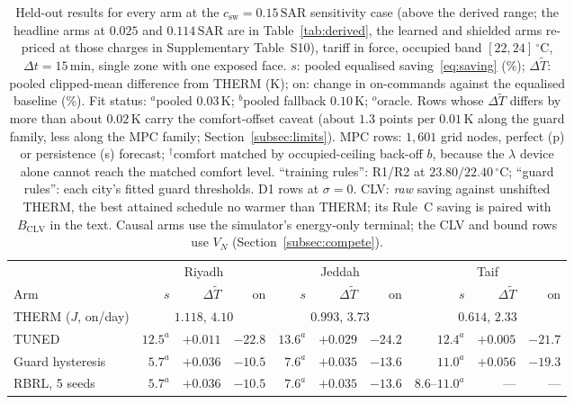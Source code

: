 \documentclass[3p,twocolumn,number]{elsarticle}
\newcommand{\csw}{c_{\mathrm{sw}}}
\newcommand{\SAR}{\text{SAR}}
\begin{document}
\begin{table}[t]
\centering
\caption{Held-out results for every arm at the $\csw=0.15\,\SAR$ sensitivity case (above the derived range; the headline arms at $0.025$ and $0.114\,\SAR$ are in Table~\ref{tab:derived}, the learned and shielded arms re-priced at those charges in Supplementary Table~S10), tariff in force, occupied band $[22,24]\,^\circ$C, $\Delta t=15\,$min, single zone with one exposed face. $s$: pooled equalised saving~\eqref{eq:saving} (\%);
$\Delta\tilde T$: pooled clipped-mean difference from THERM (K); on: change
in on-commands against the equalised baseline (\%). Fit status:
$^{a}$pooled $0.03\,$K; $^{b}$pooled fallback $0.10\,$K; $^{o}$oracle. Rows
whose $\Delta\tilde T$ differs by more than about $0.02\,$K carry the
comfort-offset caveat (about $1.3$ points per $0.01\,$K along the guard
family, less along the MPC family; Section~\ref{subsec:limits}). MPC rows: $1{,}601$ grid nodes, perfect (p) or
persistence (s) forecast; $^{\dagger}$comfort matched by occupied-ceiling
back-off $b$, because the $\lambda$ device alone cannot reach the matched
comfort level. ``training rules'': R1/R2 at $23.80/22.40\,^\circ$C; ``guard
rules'': each city's fitted guard thresholds. D1 rows at $\sigma=0$. CLV:
\emph{raw} saving against unshifted THERM, the best attained schedule no
warmer than THERM; its Rule~C saving is paired with $B_{\mathrm{CLV}}$ in the
text. Causal arms use the simulator's energy-only terminal; the CLV and bound
rows use $V_N$ (Section~\ref{subsec:compete}).}
\label{tab:main}
\setlength{\tabcolsep}{1.5pt}
\footnotesize
\begin{tabular*}{\textwidth}{@{\extracolsep{\fill}}lrrrrrrrrr@{}}
\toprule
 & \multicolumn{3}{c}{Riyadh} & \multicolumn{3}{c}{Jeddah} & \multicolumn{3}{c}{Taif} \\
\cmidrule(lr){2-4}\cmidrule(lr){5-7}\cmidrule(lr){8-10}
Arm & $s$ & $\Delta\tilde T$ & on & $s$ & $\Delta\tilde T$ & on & $s$ & $\Delta\tilde T$ & on \\
\midrule
THERM ($J$, on/day) & \multicolumn{3}{c}{$1.118$, $4.10$} & \multicolumn{3}{c}{$0.993$, $3.73$} & \multicolumn{3}{c}{$0.614$, $2.33$} \\
TUNED & $12.5^{a}$ & $+0.011$ & $-22.8$ & $13.6^{a}$ & $+0.029$ & $-24.2$ & $12.4^{a}$ & $+0.005$ & $-21.7$ \\
Guard hysteresis & $5.7^{a}$ & $+0.036$ & $-10.5$ & $7.6^{a}$ & $+0.035$ & $-13.6$ & $11.0^{a}$ & $+0.056$ & $-19.3$ \\
RBRL, 5 seeds & $5.7^{a}$ & $+0.036$ & $-10.5$ & $7.6^{a}$ & $+0.035$ & $-13.6$ & $8.6$--$11.0^{a}$ & --- & --- \\

\end{tabular*}
\end{table}
\end{document}
